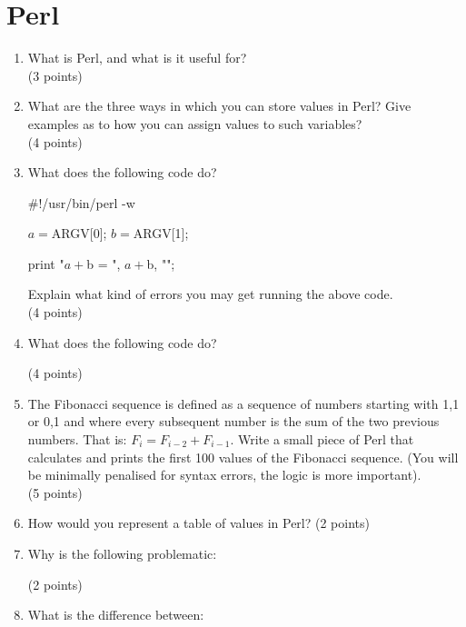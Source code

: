 \documentclass[11pt]{article}
\begin{document}
\section{Perl}
\begin{enumerate}
\item What is Perl, and what is it useful for?\\
  (3 points)
\item What are the three ways in which you can store values in Perl? Give
  examples as to how you can assign values to such variables?\\
  (4 points)
\item What does the following code do?

  \begin{perlcode}
    #!/usr/bin/perl -w
    
    $a = $ARGV[0];
    $b = $ARGV[1];

    print "$a + $b = ", $a + $b, "\n";
    
  \end{perlcode}
  Explain what kind of errors you may get running the above code.\\
  (4 points)
\item What does the following code do?

  (4 points)
\item The Fibonacci sequence is defined as a sequence of numbers starting
  with 1,1 or 0,1 and where every subsequent number is the sum of the two
  previous numbers. That is: $F_i = F_{i-2} + F_{i-1}$. Write a small piece
  of Perl that calculates and prints the first 100 values of the Fibonacci
  sequence. (You will be minimally penalised for syntax errors, the logic is
  more important).\\
  (5 points)
\item How would you represent a table of values in Perl?
  (2 points)
\item Why is the following problematic:

  (2 points)
\item What is the difference between:


\end{enumerate}
\end{document}
